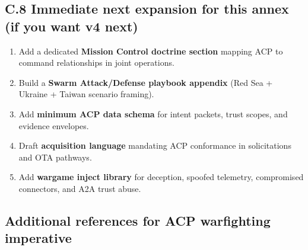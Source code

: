 \documentclass[
]{article}
\providecommand{\tightlist}{%
  \setlength{\itemsep}{0pt}\setlength{\parskip}{0pt}}
\begin{document}
\hypertarget{c.8-immediate-next-expansion-for-this-annex-if-you-want-v4-next}{%
\subsection{C.8 Immediate next expansion for this annex (if you want v4
next)}\label{c.8-immediate-next-expansion-for-this-annex-if-you-want-v4-next}}

\begin{enumerate}
\def\labelenumi{\arabic{enumi}.}
\tightlist
\item
  Add a dedicated \textbf{Mission Control doctrine section} mapping ACP
  to command relationships in joint operations.
\item
  Build a \textbf{Swarm Attack/Defense playbook appendix} (Red Sea +
  Ukraine + Taiwan scenario framing).
\item
  Add \textbf{minimum ACP data schema} for intent packets, trust scopes,
  and evidence envelopes.
\item
  Draft \textbf{acquisition language} mandating ACP conformance in
  solicitations and OTA pathways.
\item
  Add \textbf{wargame inject library} for deception, spoofed telemetry,
  compromised connectors, and A2A trust abuse.
\end{enumerate}

\hypertarget{additional-references-for-acp-warfighting-imperative}{%
\subsection{Additional references for ACP warfighting
imperative}\label{additional-references-for-acp-warfighting-imperative}}
\end{document}
